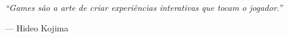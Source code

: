 \begin{epigrafe}
\vspace*{\fill}
\begin{flushright}
\textit{
“Games são a arte de criar experiências interativas que tocam o jogador.”
}

\medskip
--- Hideo Kojima
\end{flushright}
\end{epigrafe}
